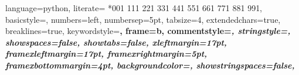  {%
	language=python,
	literate=%
	*{0}{{{\color{lightred}0}}}1
	{1}{{{\color{lightred}1}}}1
	{2}{{{\color{lightred}2}}}1
	{3}{{{\color{lightred}3}}}1
	{4}{{{\color{lightred}4}}}1
	{5}{{{\color{lightred}5}}}1
	{6}{{{\color{lightred}6}}}1
	{7}{{{\color{lightred}7}}}1
	{8}{{{\color{lightred}8}}}1
	{9}{{{\color{lightred}9}}}1,
	basicstyle=\small\ttfamily,
	numbers=left,
	numbersep=5pt,
	tabsize=4,
	extendedchars=true,
	breaklines=true,
	keywordstyle=\color{blue}\bfseries,
	frame=b,
	commentstyle=\color{brown}\itshape,
	stringstyle=\color{editorOcher}\ttfamily,
	showspaces=false,
	showtabs=false,
	xleftmargin=17pt,
	framexleftmargin=17pt,
	framexrightmargin=5pt,
	framexbottommargin=4pt,
	backgroundcolor=\color{lightgray},
	showstringspaces=false,
}
